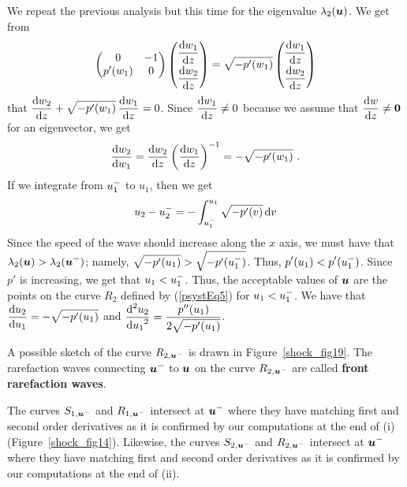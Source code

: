 \begin{egg}
We repeat the previous analysis but this time for the eigenvalue
$\lambda_2({\bm{u}})$.  We get from
\[
\begin{pmatrix} 0 & -1 \\ p'(w_1) & 0 \end{pmatrix}
\begin{pmatrix} \displaystyle \frac{\mathrm{d}w_1}{\mathrm{d}{z}} \\[0.6em]
\displaystyle \frac{\mathrm{d}w_2}{\mathrm{d}{z}} \end{pmatrix}
= \sqrt{-p'(w_1)} \begin{pmatrix} \displaystyle \frac{\mathrm{d}w_1}{\mathrm{d}{z}} \\[0.6em]
\displaystyle \frac{\mathrm{d}w_2}{\mathrm{d}{z}} \end{pmatrix}
\]
that
$\displaystyle \frac{\mathrm{d}w_2}{\mathrm{d}{z}} + \sqrt{-p'(w_1)} \, \frac{\mathrm{d}w_1}{\mathrm{d}{z}} = 0$.
Since $\displaystyle \frac{\mathrm{d}w_1}{\mathrm{d}{z}} \neq 0$ because we assume that
$\displaystyle \frac{\mathrm{d}w}{\mathrm{d}{z}} \neq {\bm{0}}$ for an eigenvector, we get
\[
\frac{\mathrm{d}w_2}{\mathrm{d}{w_1}} = \frac{\mathrm{d}w_2}{\mathrm{d}{z}} \left(  \frac{\mathrm{d}w_1}{\mathrm{d}{z}} \right)^{-1}
= -\sqrt{-p'(w_1)} \ .
\]
If we integrate from $\displaystyle u_1^-$ to $u_1$, then we get
\begin{equation} \label{psystEq6}
u_2 - u_2^- = -\int_{u_1^-}^{u_1} \sqrt{-p'(v)} \,\mathrm{d}{v}
\end{equation}
Since the speed of the wave should increase along the $x$ axis, we
must have that
$\displaystyle \lambda_2({\bm{u}}) > \lambda_2({\bm{u}}^-)$; namely,
$\displaystyle \sqrt{-p'(u_1)} > \sqrt{-p'(u_1^-)}$.  Thus,
$\displaystyle p'(u_1) < p'(u_1^-)$.  Since $p'$ is increasing, we get that
$\displaystyle u_1 < u_1^-$.
Thus, the acceptable values of ${\bm{u}}$ are the points on the curve
$R_2$ defined by (\ref{psystEq5}) for $\displaystyle u_1 < u_1^-$.  We
have that $\displaystyle \frac{\mathrm{d}u_2}{\mathrm{d}{u_1}} = -\sqrt{-p'(u_1)}$ and
$\displaystyle \frac{\displaystyle \mathrm{d}^{2}{u_2}} {\displaystyle \mathrm{d}{u_1}^{2}} = \frac{p''(u_1)}{2\sqrt{-p'(u_1)}}$.

A possible sketch of the curve $R_{2,{\bm{u}}^-}$ is drawn in
Figure~\ref{shock_fig19}.
The rarefaction waves connecting $\displaystyle {\bm{u}}^-$
to ${\bm{u}}$ on the curve $R_{2,{\bm{u}}^-}$ are called {\bfseries
front rarefaction waves}.

The curves $S_{1,{\bm{u}}^-}$ and
$R_{1,{\bm{u}}^-}$ intersect at $\displaystyle {\bm{u}}^-$ where they have matching
first and second order derivatives as it is confirmed by our
computations at the end of (i) (Figure~\ref{shock_fig14}).
Likewise, the curves $S_{2,{\bm{u}}^-}$ and
$R_{2,{\bm{u}}^-}$ intersect at $\displaystyle {\bm{u}}^-$ where they
have matching first and second order derivatives as it is confirmed by our
computations at the end of (ii).



\end{egg}
